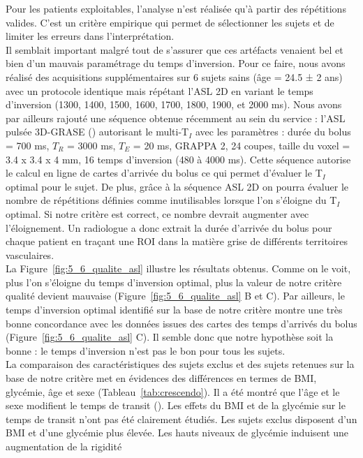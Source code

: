 Pour les patients exploitables, l’analyse n’est réalisée qu’à partir des répétitions valides. C’est un
critère empirique qui permet de sélectionner les sujets et de limiter les erreurs dans l’interprétation.\\
Il semblait important malgré tout de s’assurer que ces artéfacts venaient bel et bien d’un mauvais
paramétrage du temps d’inversion. Pour ce faire, nous avons réalisé des acquisitions supplémentaires
sur 6 sujets sains (âge = 24.5 ± 2 ans) avec un protocole identique mais répétant l’ASL 2D en variant le
temps d’inversion (1300, 1400, 1500, 1600, 1700, 1800, 1900, et 2000 ms). Nous avons par ailleurs
rajouté une séquence obtenue récemment au sein du service : l’ASL pulsée 3D-GRASE (\cite{Gunther2005}) autorisant
le multi-T$_I$ avec les paramètres : durée du bolus = 700 ms, $T_R$ = 3000 ms, $T_E$ = 20 ms, GRAPPA 2, 24
coupes, taille du voxel = 3.4 x 3.4 x 4 mm, 16 temps d’inversion (480 à 4000 ms). Cette séquence
autorise le calcul en ligne de cartes d’arrivée du bolus ce qui permet d’évaluer le T$_I$ optimal pour le
sujet. De plus, grâce à la séquence ASL 2D on pourra évaluer le nombre de répétitions définies comme
inutilisables lorsque l’on s’éloigne du T$_I$ optimal. Si notre critère est correct, ce nombre devrait
augmenter avec l’éloignement. Un radiologue a donc extrait la durée d’arrivée du bolus pour chaque
patient en traçant une ROI dans la matière grise de différents territoires vasculaires.\\
La Figure~\ref{fig:5_6_qualite_asl} illustre les résultats obtenus. Comme on le voit, plus l’on s’éloigne du temps
d’inversion optimal, plus la valeur de notre critère qualité devient mauvaise (Figure~\ref{fig:5_6_qualite_asl} B et C). Par
ailleurs, le temps d’inversion optimal identifié sur la base de notre critère montre une très bonne
concordance avec les données issues des cartes des temps d’arrivés du bolus (Figure~\ref{fig:5_6_qualite_asl} C). Il semble
donc que notre hypothèse soit la bonne : le temps d’inversion n’est pas le bon pour tous les sujets.\\
La comparaison des caractéristiques des sujets exclus et des sujets retenues sur la base de notre
critère met en évidences des différences en termes de BMI, glycémie, âge et sexe (Tableau~\ref{tab:crescendo}). Il a été
montré que l’âge et le sexe modifient le temps de transit (\cite{Liu2012}). Les effets du BMI et de la glycémie sur
le temps de transit n’ont pas été clairement étudiés. Les sujets exclus disposent d’un BMI et d’une
glycémie plus élevée. Les hauts niveaux de glycémie induisent une augmentation de la rigidité

